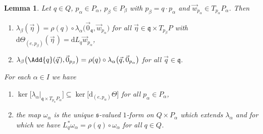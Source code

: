 \documentclass[pdftex]{sigma}
\numberwithin{equation}{section}
\newtheorem{Lemma}[Theorem]{Lemma}
\begin{document}
\begin{Lemma}
\label{lemma:lambda}
Let $q\in Q$, $p_\alpha\in P_\alpha$, $p_\beta\in P_\beta$ with $p_\beta=q\cdot p_\alpha$ and $\vec{w}_{p_\alpha}\in
T_{p_\alpha}P_\alpha$.
Then
\begin{enumerate}\itemsep=0pt
\item[$1)$]
$\lambda_\beta(\vec{\eta}\hspace{1pt})=\rho(q)\circ \lambda_\alpha\big(\vec{0}_{\mathfrak{q}},\vec{w}_{p_\alpha}\big)$ for all
$\vec{\eta}\in \mathfrak{q}\times T_{p_\beta}P$ with $\mathrm{d}\Theta_{(e,p_\beta)}(\vec{\eta}\hspace{1pt})=\mathrm{d}
L_q\vec{w}_{p_\alpha}$,
\item[$2)$]
$\lambda_\beta\big(\Add{q}(\vec{q}\hspace{1pt}),\vec{0}_{p_\beta}\big)=\rho(q)\circ
\lambda_\alpha\big(\vec{q},\vec{0}_{p_\alpha}\big)$ for all $\vec{q}\in \mathfrak{q}$.
\end{enumerate}
For each $\alpha \in I$ we have
\begin{enumerate}\itemsep=0pt
\item[$3)$] $\ker\big[\lambda_\alpha|_{\mathfrak{q}\times T_{p_\alpha}P_\alpha}\big]\subseteq
\ker\big[\mathrm{d}_{(e,p_\alpha)}\Theta\big]$ for all $p_\alpha\in P_\alpha$,
\item[$4)$] the map $\omega_\alpha$ is
the unique $\mathfrak{s}$-valued $1$-form on $Q\times P_\alpha$ which extends $\lambda_\alpha$ and for which we have
$L_q^{*}\omega_\alpha=\rho(q)\circ \omega_\alpha$ for all $q\in Q$.
\end{enumerate}
\end{Lemma}
\end{document}
